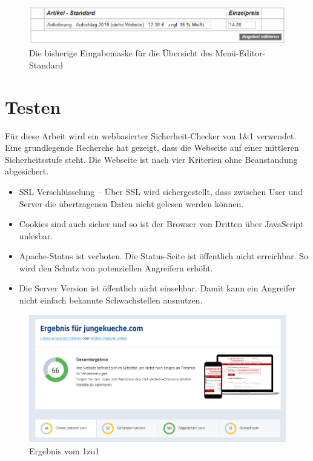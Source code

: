 \begin{figure}[h]
	\centering
	\includegraphics[width=0.7\linewidth]{Graphics/menuStandart.png}
	\caption[Kundeansicht]{Die bisherige Eingabemaske für die Übersicht des Menü-Editor-Standard}
	\label{fig: Editor-Menü-Standard}
\end{figure}


\section{Testen} 

Für diese Arbeit wird ein webbasierter Sicherheit-Checker von 1\&1 verwendet. Eine grundlegende Recherche hat gezeigt, dass die Webseite auf einer mittleren Sicherheitsstufe steht. Die Webseite ist nach vier Kriterien ohne Beanstandung abgesichert.

\begin{itemize}	
	
\item\ac{SSL} Verschlüsselung – Über SSL wird sichergestellt, dass zwischen User und Server die übertragenen Daten nicht gelesen werden können.

\item Cookies sind auch sicher und so ist der Browser von Dritten über JavaScript unlesbar.

\item Apache-Status ist verboten. Die Status-Seite ist öffentlich nicht erreichbar. So wird den Schutz von potenziellen Angreifern erhöht. 

\item Die Server Version ist öffentlich nicht einsehbar. Damit kann ein Angreifer nicht einfach bekannte Schwachstellen ausnutzen.
\end{itemize}

\begin{figure}[h]
	\centering
	\includegraphics[width=1\linewidth]{Graphics/egebnis1to1.png}
	\caption[Egebniss Von 1zu1]{Ergebnis vom 1zu1}
	\label{fig: ErgebnissVonEinZuEin}
\end{figure}

